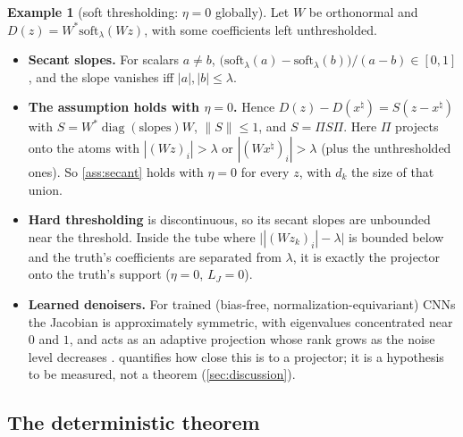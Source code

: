 \documentclass[11pt]{article}
\theoremstyle{definition}
\newtheorem{example}[theorem]{Example}
\theoremstyle{remark}
\newcommand{\norm}[1]{\lVert #1\rVert}
\newcommand{\xt}{x^\natural}
\begin{document}
\begin{example}[soft thresholding: $\eta=0$ globally]\label{ex:soft}
Let $W$ be orthonormal and $D(z)=W^*\mathrm{soft}_\lambda(Wz)$, with some coefficients left unthresholded.
\begin{itemize}
\item \textbf{Secant slopes.} For scalars $a\neq b$, $\big(\mathrm{soft}_\lambda(a)-\mathrm{soft}_\lambda(b)\big)/(a-b)\in[0,1]$,
  and the slope vanishes iff $|a|,|b|\leq\lambda$.
\item \textbf{The assumption holds with $\eta=0$.} Hence $D(z)-D(\xt)=S(z-\xt)$ with
  $S=W^*\operatorname{diag}(\text{slopes})W$, $\norm S\leq1$, and $S=\Pi S\Pi$. Here $\Pi$ projects onto the atoms
  with $|(Wz)_i|>\lambda$ or $|(W\xt)_i|>\lambda$ (plus the unthresholded ones). So \cref{ass:secant} holds with
  $\eta=0$ for every $z$, with $d_k$ the size of that union.
\item \textbf{Hard thresholding} is discontinuous, so its secant slopes are unbounded near the threshold. Inside
  the tube where $\big||(Wz_k)_i|-\lambda\big|$ is bounded below and the truth's coefficients are separated from
  $\lambda$, it is exactly the projector onto the truth's support ($\eta=0$, $L_J=0$).
\item \textbf{Learned denoisers.} For trained (bias-free, normalization-equivariant) CNNs the Jacobian is
  approximately symmetric, with eigenvalues concentrated near $0$ and $1$, and acts as an adaptive projection whose
  rank grows as the noise level decreases \cite{mohan2020,kadkhodaie2024}.  quantifies how close
  this is to a projector; it is a hypothesis to be measured, not a theorem (\cref{sec:discussion}).
\end{itemize}
\end{example}

\subsection{The deterministic theorem}
\end{document}
